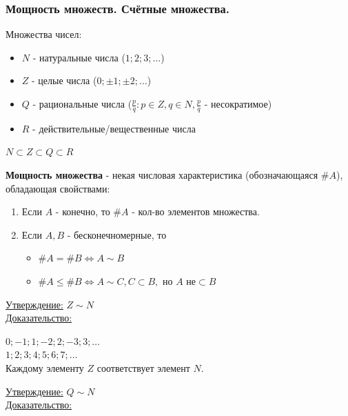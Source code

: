 \documentclass[12pt]{article}
\begin{document}
    \subsubsection*{Мощность множеств. Счётные множества.}
    Множества чисел:
    \begin{itemize}
        \item $N$ - натуральные числа ($1;2;3;\dots$)
        \item $Z$ - целые числа ($0;\pm1;\pm2;\dots$)
        \item $Q$ - рациональные числа ($\frac{p}{q} : p \in Z, q \in N, \frac{p}{q}$ - несократимое)
        \item $R$ - действительные/вещественные числа
    \end{itemize}
    $N \subset Z \subset Q \subset R$\par
    \noindent \textbf{Мощность множества} - некая числовая характеристика (обозначающаяся $\#A$), обладающая свойствами:
    \begin{enumerate}
        \item Если $A$ - конечно, то $\#A$ - кол-во элементов множества.
        \item Если $A,B$ - бесконечномерные, то \begin{itemize}
            \item $\#A = \#B \Leftrightarrow A \sim B$
            \item $\#A \le \#B \Leftrightarrow A \sim C, C \subset B, \text{ но } A \text{ не} \subset B$
        \end{itemize}
    \end{enumerate}
    \underline{Утверждение:} $Z \sim N$\\
    \underline{Доказательство:}
    \begin{adjustwidth}{1.5em}{1.5em}
        $0;-1;1;-2;2;-3;3;\dots$\\
        $1;2;3;4;5;6;7;\dots$\\
        Каждому элементу $Z$ соответствует элемент $N$.        
    \end{adjustwidth}
    \noindent \underline{Утверждение:} $Q \sim N$\\
    \underline{Доказательство:}
\end{document}
